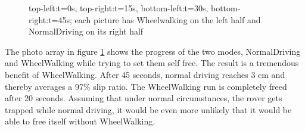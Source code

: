 \documentclass[a4paper,twocolumn]{esapub2005} %
\begin{document}
\begin{figure}[h!]
	\centering	
	\caption{top-left:t=0s,  top-right:t=15s, bottom-left:t=30s, bottom-right:t=45s; each picture has Wheelwalking on the left half and NormalDriving on its right half }
	\label{fig:volleysequence}
\end{figure}

The photo array in figure \ref{fig:volleysequence} shows the progress of the two modes, NormalDriving and WheelWalking while trying to set them self free. The result is a tremendous benefit of WheelWalking. After 45 seconds, normal driving reaches 3 cm and thereby averages a 97\% slip ratio. The WheelWalking run is completely freed after 20 seconds. Assuming that under normal circumstances, the rover gets trapped while normal driving, it would be even more unlikely that it would be able to free itself without WheelWalking.

\end{document}
